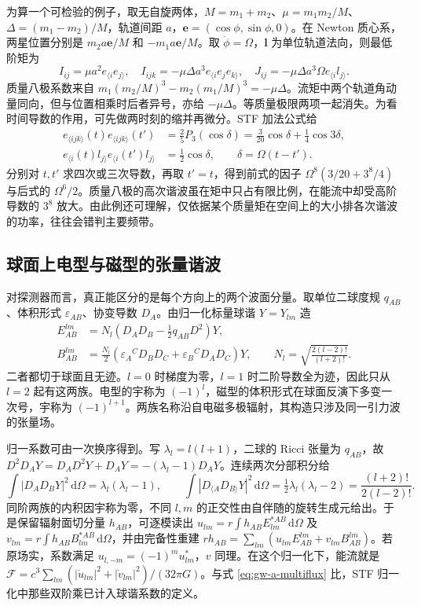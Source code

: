 为算一个可检验的例子，取无自旋两体，$M=m_1+m_2$、$\mu=m_1m_2/M$、$\Delta=(m_1-m_2)/M$，轨道间距 $a$，$\bm e=(\cos\phi,\sin\phi,0)$。在 Newton 质心系，两星位置分别是 $m_2a\bm e/M$ 和 $-m_1a\bm e/M$。取 $\dot\phi=\Omega$，$\bm l$ 为单位轨道法向，则最低阶矩为
\[
 I_{ij}=\mu a^2 e_{\langle i}e_{j\rangle},\quad
 I_{ijk}=-\mu\Delta a^3e_{\langle i}e_je_{k\rangle},\quad
 J_{ij}=-\mu\Delta a^3\Omega e_{\langle i} l_{j\rangle}.
\]
质量八极系数来自 $m_1(m_2/M)^3-m_2(m_1/M)^3=-\mu\Delta$。流矩中两个轨道角动量同向，但与位置相乘时后者异号，亦给 $-\mu\Delta$。等质量极限两项一起消失。为看时间导数的作用，可先做两时刻的缩并再微分。STF 加法公式给
\begin{align*}
 e_{\langle ijk\rangle}(t)e_{\langle ijk\rangle}(t')
 &=\tfrac25 P_3(\cos\delta)
 =\tfrac{3}{20}\cos\delta+\tfrac14\cos3\delta,\\
 e_{\langle i}(t)l_{j\rangle}e_{\langle i}(t')l_{j\rangle}
 &=\tfrac12\cos\delta,\qquad \delta=\Omega(t-t').
\end{align*}
分别对 $t,t'$ 求四次或三次导数，再取 $t'=t$，得到前式的因子 $\Omega^8(3/20+3^8/4)$ 与后式的 $\Omega^6/2$。质量八极的高次谐波虽在矩中只占有限比例，在能流中却受高阶导数的 $3^8$ 放大。由此例还可理解，仅依据某个质量矩在空间上的大小排各次谐波的功率，往往会错判主要频带。

\subsection{球面上电型与磁型的张量谐波}

对探测器而言，真正能区分的是每个方向上的两个波面分量。取单位二球度规 $q_{AB}$、体积形式 $\varepsilon_{AB}$、协变导数 $D_A$。由归一化标量球谐 $Y=Y_{lm}$ 造
\begin{align*}
 E^{lm}_{AB}&=N_l\left(D_A D_B-\tfrac12q_{AB}D^2\right)Y,\\
 B^{lm}_{AB}&=\tfrac{N_l}{2}
      (\varepsilon_A{}^C D_BD_C+\varepsilon_B{}^C D_AD_C)Y,\qquad
 N_l=\sqrt{\frac{2(l-2)!}{(l+2)!}} .
\end{align*}
二者都切于球面且无迹。$l=0$ 时梯度为零，$l=1$ 时二阶导数全为迹，因此只从 $l=2$ 起有这两族。电型的宇称为 $(-1)^l$，磁型的体积形式在球面反演下多变一次号，宇称为 $(-1)^{l+1}$。两族名称沿自电磁多极辐射，其构造只涉及同一引力波的张量场。

归一系数可由一次换序得到。写 $\lambda_l=l(l+1)$，二球的 Ricci 张量为 $q_{AB}$，故 $D^2D_AY=D_AD^2Y+D_AY=-(\lambda_l-1)D_AY$。连续两次分部积分给
\[
 \int |D_AD_BY|^2\,\mathrm d\Omega=\lambda_l(\lambda_l-1),\qquad
 \int |D_{\langle A}D_{B\rangle}Y|^2\,\mathrm d\Omega
   =\tfrac12\lambda_l(\lambda_l-2)=\frac{(l+2)!}{2(l-2)!}.
\]
同阶两族的内积因宇称为零，不同 $l,m$ 的正交性由自伴随的旋转生成元给出。于是保留辐射面切分量 $h_{AB}$，可逐模读出 $u_{lm}=r\int h_{AB}E_{lm}^{*AB}\,\mathrm d\Omega$ 及 $v_{lm}=r\int h_{AB}B_{lm}^{*AB}\,\mathrm d\Omega$，并由完备性重建 $rh_{AB}=\sum_{lm}(u_{lm}E^{lm}_{AB}+v_{lm}B^{lm}_{AB})$。若原场实，系数满足 $u_{l,-m}=(-1)^m u_{lm}^*$，$v$ 同理。在这个归一化下，能流就是 $\mathcal F=c^3\sum_{lm}(|\dot u_{lm}|^2+|\dot v_{lm}|^2)/(32\pi G)$。与式 \eqref{eq:gw-a-multiflux} 比，STF 归一化中那些双阶乘已计入球谐系数的定义。

